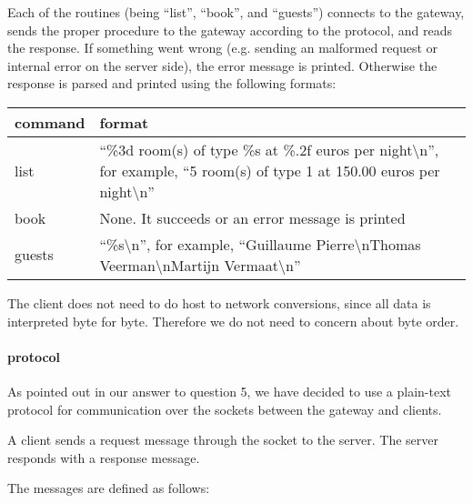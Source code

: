 \documentclass[a4paper,10pt]{article}
\begin{document}
Each of the routines (being ``list'', ``book'', and ``guests'')
connects to the gateway, sends the proper procedure to the gateway
according to the protocol, and reads the response. If something went
wrong (e.g. sending an malformed request or internal error on the
server side), the error message is printed. Otherwise the response is
parsed and printed using the following formats:

\begin{center}
\begin{tabular}{ l | p{9.3cm} }
\textbf{command} & \textbf{format}\\ \hline
list & ``\%3d room(s) of type \%s at \%.2f euros per night\textbackslash n'', for example, ``5 room(s) of type 1 at 150.00 euros per night\textbackslash n''\\ \hline
book & None. It succeeds or an error message is printed \\ \hline
guests & ``\%s\textbackslash n'', for example, ``Guillaume Pierre\textbackslash nThomas Veerman\textbackslash nMartijn Vermaat\textbackslash n'' \\
\end{tabular}
\end{center}

The client does not need to do host to network conversions, since all data is interpreted byte for byte. Therefore we do not need to concern about byte order.

\paragraph{protocol}
As pointed out in our answer to question 5, we have decided to use a
plain-text protocol for communication over the sockets between the
gateway and clients.

A client sends a request message through the socket to the server. The
server responds with a response message.

The messages are defined as follows:
\end{document}

